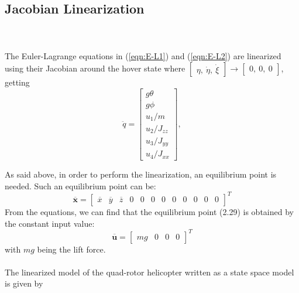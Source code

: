 \subsection{Jacobian Linearization}
\cite{Sabatino2015}
\\\\
The Euler-Lagrange equations in (\ref{eqn:E-L1}) and (\ref{eqn:E-L2}) are linearized using their Jacobian around the hover state where $\begin{bmatrix}
\eta,\ \dot{\eta},\ \dot{\xi}
\end{bmatrix} \to \begin{bmatrix}
0,\ 0,\ 0
\end{bmatrix}$, getting
\begin{equation}
\label{eqn:linear}
\ddot{q}
=
\begin{bmatrix}
g\theta \\
g\phi\\
u_{1}/m \\
u_{2}/J_{zz} \\
u_{3}/J_{yy} \\
u_{4}/J_{xx}
\end{bmatrix},
\end{equation}

As said above, in order to perform the linearization, an equilibrium point is
needed. Such an equilibrium point can be:
\begin{equation}
\overline{\mathbf{x}} = \begin{bmatrix}
\overline{x} & \overline{y} & \overline{z} & 0 & 0 & 0 & 0 & 0 & 0 & 0 & 0 & 0
\end{bmatrix}^{T}
\end{equation}
From the equations, we can find that the equilibrium point (2.29) is obtained by
the constant input value:
\begin{equation}
\overline{\mathbf{u}} = \begin{bmatrix}
mg & 0 & 0 & 0
\end{bmatrix}^{T}
\end{equation}
with $mg$ being the lift force.
\\\\
The linearized model of the quad-rotor helicopter written as a state space model is given by

